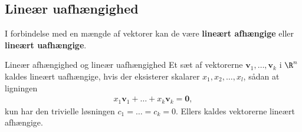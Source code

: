 \subsection{Lineær uafhængighed}
I forbindelse med en mængde af vektorer kan de være \textbf{lineært afhængige} eller \textbf{lineært uafhængige}.
%
%
% 
\begin{defn}{Lineær afhængighed og lineær uafhængighed}{}
Et sæt af vektorerne $\mathbf{v}_1, \ldots , \mathbf{v}_k$ i $\R^n$ kaldes lineært uafhængige, hvis der eksisterer skalarer $x_1,x_2, \ldots , x_l$, sådan at ligningen 
\begin{align*}
x_1\mathbf{v}_1 + \ldots + x_k \mathbf{v}_k = \mathbf{0}, 
\end{align*}
kun har den trivielle løsningen $c_1 = \ldots = c_k = 0$.
Ellers kaldes vektorerne lineært afhængige.
\end{defn}  
%
